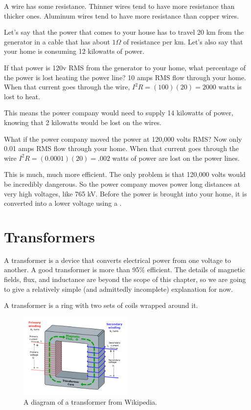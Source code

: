 A wire has some resistance. Thinner wires tend to have more resistance
than thicker ones. Aluminum wires tend to have more resistance than
copper wires.

Let's say that the power that comes to your house has to travel 20 km
from the generator in a cable that has about $1 \Omega$ of resistance
per km.  Let's also say that your home is consuming 12 kilowatts of power.

If that power is 120v RMS from the generator to your home, what
percentage of the power is lost heating the power line? 10 amps RMS
flow through your home. When that current goes through the wire, $I^2
R = (100)(20) = 2000 \text{ watts}$ is lost to heat.

This means the power company would need to supply 14 kilowatts of power,
knowing that 2 kilowatts would be lost on the wires.

What if the power company moved the power at 120,000 volts RMS? Now
only 0.01 amps RMS flow through your home. When that current goes
through the wire $I^2R = (0.0001)(20) = .002$ watts of power are lost
on the power lines.

This is much, much more efficient. The only problem is that 120,000 volts
would be incredibly dangerous.  So the power company moves power long
distances at very high voltages, like 765 kV.  Before the power is
brought into your home, it is converted into a lower voltage using a
.

\section{Transformers}

A transformer is a device that converts electrical power from one
voltage to another. A good transformer is more than 95\% efficient. The
details of magnetic fields, flux, and inductance are beyond the scope
of this chapter, so we are going to give a relatively simple (and admittedly incomplete) explanation for now.

A transformer is a ring with two sets of coils wrapped around it.
\begin{figure}[htbp]
    \centering
    \includegraphics[width=0.5\textwidth]{transformer.png}
    \caption{A diagram of a transformer from Wikipedia.}
    \label{fig:transformer}
\end{figure}

